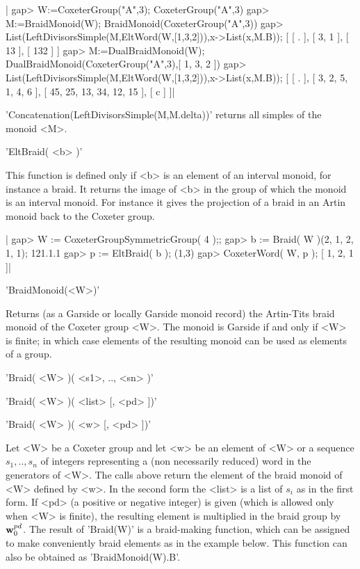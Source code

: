 |    gap> W:=CoxeterGroup("A",3);
    CoxeterGroup("A",3)
    gap> M:=BraidMonoid(W);
    BraidMonoid(CoxeterGroup("A",3))
    gap> List(LeftDivisorsSimple(M,EltWord(W,[1,3,2])),x->List(x,M.B));
    [ [ . ], [ 3, 1 ], [ 13 ], [ 132 ] ]
    gap> M:=DualBraidMonoid(W);
    DualBraidMonoid(CoxeterGroup("A",3),[ 1, 3, 2 ])
    gap> List(LeftDivisorsSimple(M,EltWord(W,[1,3,2])),x->List(x,M.B));
    [ [ . ], [ 3, 2, 5, 1, 4, 6 ], [ 45, 25, 13, 34, 12, 15 ], [ c ] ]|

'Concatenation(LeftDivisorsSimple(M,M.delta))'  returns all  simples of the
monoid <M>.


'EltBraid( <b> )'

This  function is defined only if <b>  is an element of an interval monoid,
for instance a braid. It returns the image of <b> in the group of which the
monoid  is an interval  monoid. For instance  it gives the  projection of a
braid in an Artin monoid back to the Coxeter group.

|    gap>  W := CoxeterGroupSymmetricGroup( 4 );;
    gap>  b := Braid( W )(2, 1, 2, 1, 1);
    121.1.1
    gap> p := EltBraid( b );
    (1,3)
    gap> CoxeterWord( W, p );
    [ 1, 2, 1 ]|


'BraidMonoid(<W>)'

Returns (as a  Garside or locally Garside monoid  record) the Artin-Tits
braid monoid of the Coxeter group <W>. The monoid is Garside if and only
if <W> is finite; in which case  elements of the resulting monoid can be
used as elements of a group.


'Braid( <W> )( <s1>, .., <sn> )'

'Braid( <W> )( <list> [, <pd> ])'

'Braid( <W> )( <w> [, <pd> ])'

Let  <W> be a Coxeter group and let <w>  be an element of <W> or a sequence
$s_1,..,s_n$  of integers representing a  (non necessarily reduced) word in
the  generators of  <W>. The  calls above  return the  element of the braid
monoid  of <W> defined by <w>.  In the second form the  <list> is a list of
$s_i$  as in the  first form. If  <pd> (a positive  or negative integer) is
given  (which is allowed only when <W> is finite), the resulting element is
multiplied  in the braid group by ${\bf w}_0^{pd}$. The result of 'Braid(W)' is
a  braid-making function, which can be  assigned to make conveniently braid
elements  as in the  example below. This  function can also  be obtained as
'BraidMonoid(W).B'.

